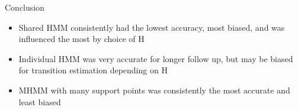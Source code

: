 \documentclass{beamer}
\begin{document}
    
\begin{frame}{Conclusion}
\begin{itemize}
    \item Shared HMM consistently had the lowest accuracy, most biased, and was influenced the most by choice of H
    \item Individual HMM was very accurate for longer follow up, but may be biased for transition estimation depending on H
    \item MHMM with many support points was consistently the most accurate and least biased 
\end{itemize}

    
\end{frame}


    
    
\end{document}

